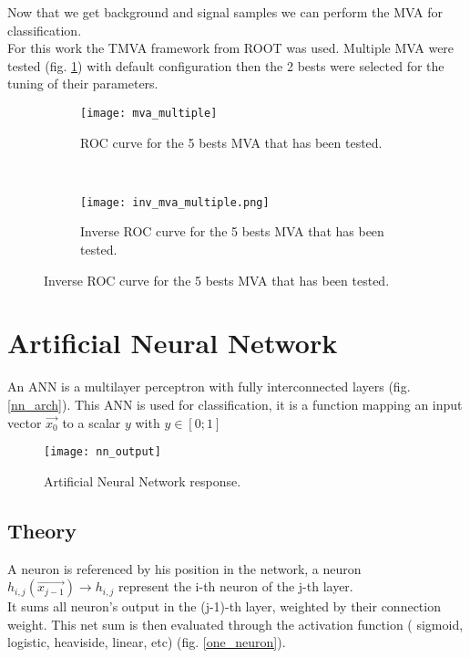 \label{sec:unchapitre}


Now that we get background and signal samples we can perform the MVA for classification.\\
For this work the TMVA framework from ROOT was used. Multiple MVA were tested (fig. \ref{mva_multiple}) with default configuration then the 2
bests were selected for the tuning of their parameters.\\

\begin{figure}[h!]
\centering
    \begin{subfigure}[h!]{0.4\textwidth}
    \centering
        \texttt{[image: mva\_multiple]}
        \caption{ROC curve for the 5 bests MVA that has been tested.}
        \label{mva_multiple}
  \end{subfigure}
  ~
    \begin{subfigure}[h!]{0.4\textwidth}
    \centering
        \texttt{[image: inv\_mva\_multiple.png]}
        \caption{Inverse ROC curve for the 5 bests MVA that has been tested.}
        \label{inv_mva_multiple}
  \end{subfigure}
\end{figure}


\section{Artificial Neural Network}

An ANN is a multilayer perceptron with fully interconnected layers (fig. \ref{nn_arch}).
This ANN is used for classification, it is a function mapping an input vector $\vec{x_0}$ to a scalar $y$ with $y \in [0;1]$
\begin{figure}[h!]
    \texttt{[image: nn\_output]}
    \caption{Artificial Neural Network response.}
    \label{nn_output}
\end{figure}


\subsection{Theory}

A neuron is referenced by his position in the network, a neuron $h_{i,j}(\vec{x_{j-1}}) \rightarrow h_{i,j}$ represent the i-th neuron of the j-th layer.\\
It sums all neuron's output in the (j-1)-th layer, weighted by their connection weight. This net sum is then evaluated through the activation function ( sigmoid, logistic, heaviside, linear, etc) (fig. \ref{one_neuron}).

